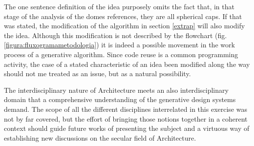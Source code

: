 \documentclass[preprint,12pt,3p]{elsarticle}
\begin{document}
The one sentence definition of the idea purposely omits the fact that, in that stage of the analysis of the domes references, they are all spherical caps. If that was stated, the modification of the algorithm in section \ref{extrap} will also modify the idea. Although this modification is not described by the flowchart (fig. \ref{figura:fluxogramametodologia}) it is indeed a possible movement in the work process of a generative algorithm. Since code reuse is a common programming activity, the case of a stated characteristic of an idea been modified along the way should not me treated as an issue, but as a natural possibility.

The interdisciplinary nature of Architecture meets an also interdisciplinary domain that a comprehensive understanding of the generative design systems demand. The scope of all the different disciplines interrelated in this exercise was not by far covered, but the effort of bringing those notions together in a coherent context should guide future works of presenting the subject and a virtuous way of establishing new discussions on the secular field of Architecture.









% 
% 
% 
% 
% 
% 
% 
% 
% 
% 
% 
% 


\end{document}
